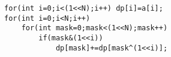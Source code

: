 \begin{lstlisting}
for(int i=0;i<(1<<N);i++) dp[i]=a[i];
for(int i=0;i<N;i++)
    for(int mask=0;mask<(1<<N);mask++)
        if(mask&(1<<i))
            dp[mask]+=dp[mask^(1<<i)];
\end{lstlisting}